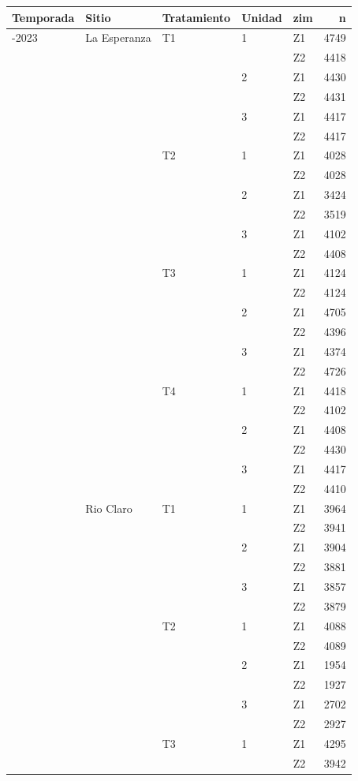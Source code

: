 \documentclass[
  letterpaper,
  DIV=11,
  numbers=noendperiod]{scrreprt}
\begin{document}
\begin{longtable}[]{@{}lllllr@{}}
\toprule\noalign{}
Temporada & Sitio & Tratamiento & Unidad & zim & n \\
\midrule\noalign{}
\endhead
\bottomrule\noalign{}
\endlastfoot
2022-2023 & La Esperanza & T1 & 1 & Z1 & 4749 \\
& & & & Z2 & 4418 \\
& & & 2 & Z1 & 4430 \\
& & & & Z2 & 4431 \\
& & & 3 & Z1 & 4417 \\
& & & & Z2 & 4417 \\
& & T2 & 1 & Z1 & 4028 \\
& & & & Z2 & 4028 \\
& & & 2 & Z1 & 3424 \\
& & & & Z2 & 3519 \\
& & & 3 & Z1 & 4102 \\
& & & & Z2 & 4408 \\
& & T3 & 1 & Z1 & 4124 \\
& & & & Z2 & 4124 \\
& & & 2 & Z1 & 4705 \\
& & & & Z2 & 4396 \\
& & & 3 & Z1 & 4374 \\
& & & & Z2 & 4726 \\
& & T4 & 1 & Z1 & 4418 \\
& & & & Z2 & 4102 \\
& & & 2 & Z1 & 4408 \\
& & & & Z2 & 4430 \\
& & & 3 & Z1 & 4417 \\
& & & & Z2 & 4410 \\
& Rio Claro & T1 & 1 & Z1 & 3964 \\
& & & & Z2 & 3941 \\
& & & 2 & Z1 & 3904 \\
& & & & Z2 & 3881 \\
& & & 3 & Z1 & 3857 \\
& & & & Z2 & 3879 \\
& & T2 & 1 & Z1 & 4088 \\
& & & & Z2 & 4089 \\
& & & 2 & Z1 & 1954 \\
& & & & Z2 & 1927 \\
& & & 3 & Z1 & 2702 \\
& & & & Z2 & 2927 \\
& & T3 & 1 & Z1 & 4295 \\
& & & & Z2 & 3942 \\

\end{longtable}
\end{document}

